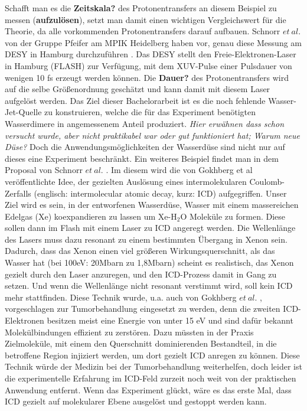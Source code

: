   Schafft man es die \textbf{Zeitskala?} des Protonentransfers an diesem Beispiel zu messen (\textbf{aufzulösen}), setzt man damit einen wichtigen Vergleichswert für die Theorie, da alle vorkommenden Protonentransfers darauf aufbauen. Schnorr $et\ al.$ von der Gruppe Pfeifer am MPIK Heidelberg haben vor, genau diese Messung am DESY in Hamburg durchzuführen \cite{SchPTD15}. Das DESY stellt den Freie-Elektronen-Laser in Hamburg (FLASH) zur Verfügung, mit dem XUV-Pulse einer Pulsdauer von wenigen 10 fs erzeugt werden können. Die \textbf{Dauer?} des Protonentransfers wird auf die selbe Größenordnung geschätzt und kann damit mit diesem Laser aufgelöst werden.
  Das Ziel dieser Bachelorarbeit ist es die noch fehlende Wasser-Jet-Quelle zu konstruieren, welche die für das Experiment benötigten Wasserdimere in angemessenem Anteil produziert. 
  \textit{Hier erwähnen dass schon versucht wurde, aber nicht praktikabel war oder gut funktioniert hat; Warum neue Düse?}
  Doch die Anwendungsmöglichkeiten der Wasserdüse sind nicht nur auf dieses eine Experiment beschränkt. Ein weiteres Beispiel findet man in dem Proposal von Schnorr $et\ al.$ \cite{SchICD15}. Im diesem wird die von Gokhberg et al \cite{gokhberg2014} veröffentlichte Idee, der gezielten Auslösung eines intermolekularen Coulomb-Zerfalls (englisch: intermolecular atomic decay, kurz: ICD) aufgegriffen. Unser Ziel wird es sein, in der entworfenen Wasserdüse, Wasser mit einem massereichen Edelgas (Xe) koexpandieren zu lassen um Xe-H$_2$O Moleküle zu formen. Diese sollen dann im Flash mit einem Laser zu ICD angeregt werden. Die Wellenlänge des Lasers muss dazu resonant zu einem bestimmten Übergang in Xenon sein. Dadurch, dass das Xenon einen viel größeren Wirkungsquerschnitt, als das Wasser hat (bei 100eV: 20Mbarn zu 1,8Mbarn) scheint es realistisch, das Xenon gezielt durch den Laser anzuregen, und den ICD-Prozess damit in Gang zu setzen. Und wenn die Wellenlänge nicht resonant verstimmt wird, soll kein ICD mehr stattfinden. Diese Technik wurde, u.a. auch von Gokhberg $et\ al.$ \cite{gokhberg2014}, vorgeschlagen zur Tumorbehandlung eingesetzt zu werden, denn die zweiten ICD-Elektronen besitzen meist eine Energie von unter 15 eV und sind dafür bekannt Molekülbindungen effizient zu zerstören.  Dazu müssten in der Praxis Zielmoleküle, mit einem den Querschnitt dominierenden Bestandteil, in die betroffene Region injiziert werden, um dort gezielt ICD anregen zu können. 
  Diese Technik würde der Medizin bei der Tumorbehandlung weiterhelfen, doch leider ist die experimentelle Erfahrung im ICD-Feld zurzeit noch weit von der praktischen Anwendung entfernt. Wenn das Experiment glückt, wäre es das erste Mal, dass ICD gezielt auf molekularer Ebene ausgelöst und gestoppt werden kann.
  

